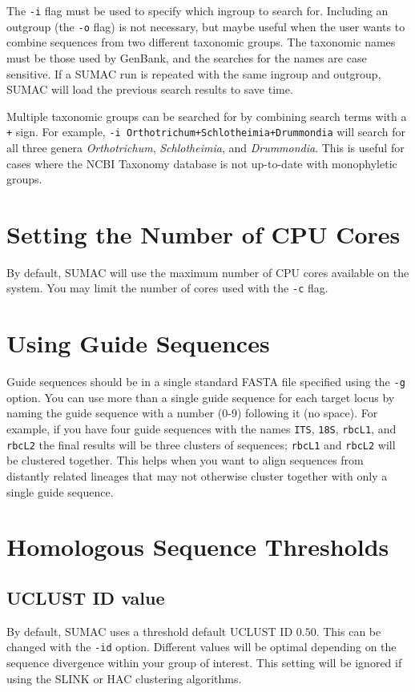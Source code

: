 \documentclass[10pt]{report}
\begin{document}
The \verb|-i| flag must be used to specify which ingroup to search for. 
Including an outgroup (the \texttt{-o} flag) is not necessary, 
but maybe useful when the user wants to combine sequences from two
different taxonomic groups.
The taxonomic names must be those used by GenBank, and the 
searches for the names are case sensitive.
If a SUMAC run is repeated with the same ingroup and outgroup, SUMAC
will load the previous search results to save time.

Multiple taxonomic groups can be searched for by combining
search terms with a \texttt{+} sign. For example,
\texttt{-i Orthotrichum+Schlotheimia+Drummondia} will
search for all three genera \textit{Orthotrichum},
\textit{Schlotheimia}, and \textit{Drummondia}.
This is useful for cases where the NCBI Taxonomy database
is not up-to-date with monophyletic groups.

\section{Setting the Number of CPU Cores}

By default, SUMAC will use the maximum number of CPU cores
available on the system. You may limit the number of cores
used with the \texttt{-c} flag.

\section{Using Guide Sequences}

Guide sequences should be in a single standard FASTA file specified
using the \verb|-g| option. 
You can use more than a single guide sequence for each target locus
by naming the guide sequence with a number (0-9) following it (no space).
For example, if you have four guide sequences with the names
\texttt{ITS}, \texttt{18S}, \texttt{rbcL1}, and \texttt{rbcL2}
the final results will be three clusters of sequences;
\texttt{rbcL1} and \texttt{rbcL2} will be clustered together.
This helps when you want to align sequences from distantly
related lineages that may not otherwise cluster together with
only a single guide sequence.

\section{Homologous Sequence Thresholds}

\subsection{UCLUST ID value}
By default, SUMAC uses a threshold default UCLUST ID $0.50$.
This can be changed with the \verb|-id| option.
Different values will be optimal depending on the sequence
divergence within your group of interest.
This setting will be ignored if using the SLINK or HAC
clustering algorithms.
\end{document}
